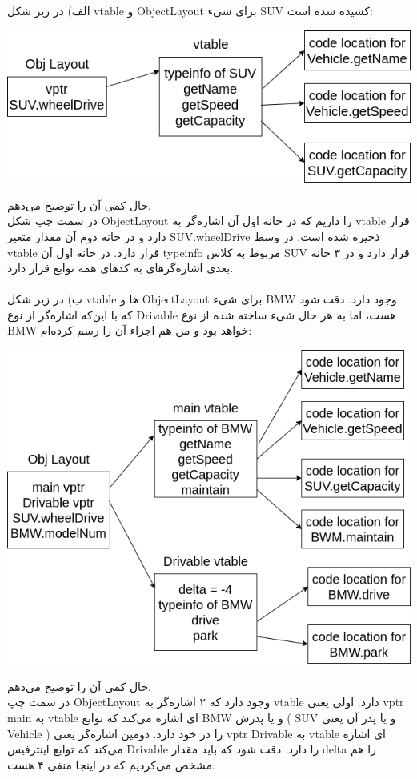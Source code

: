 
الف) در زیر شکل vtable و ObjectLayout برای شیء SUV کشیده شده است:
\graphicspath{{./images/}}
\begin{center}
	\includegraphics[scale=0.7]{Q4_1.png}
\end{center}
حال کمی آن را توضیح می‌دهم.\\
در سمت چپ شکل ObjectLayout را داریم که در خانه اول آن اشاره‌گر به vtable قرار دارد و در خانه دوم آن مقدار متغیر SUV.wheelDrive ذخیره شده است.
در وسط vtable قرار دارد. در خانه اول آن typeinfo مربوط به کلاس SUV قرار دارد و در ۳ خانه بعدی اشاره‌گرهای به کدهای همه توابع قرار دارد.\\\\
ب) در زیر شکل  vtable ها و ObjectLayout برای شیء BMW وجود دارد. دقت شود که با این‌که اشاره‌گر از نوع Drivable هست، اما به هر حال شیء ساخته شده از نوع BMW خواهد بود و من هم اجزاء آن را رسم کرده‌ام:
\graphicspath{{./images/}}
\begin{center}
	\includegraphics[scale=0.7]{Q4_2.png}
\end{center}
حال کمی آن را توضیح می‌دهم.\\
در سمت چپ ObjectLayout وجود دارد که ۲ اشاره‌گر به vtable دارد. اولی یعنی vptr main به vtable ای اشاره می‌کند که توابع BMW و یا پدرش ( SUV و یا پدر آن یعنی Vehicle ) را در خود دارد. دومین اشاره‌‌گر یعنی vptr Drivable به vtable ای اشاره می‌کند که توابع  اینترفیس Drivable را دارد. دقت شود که باید مقدار delta را هم مشخص می‌کردیم که در اینجا منفی ۴ هست.
